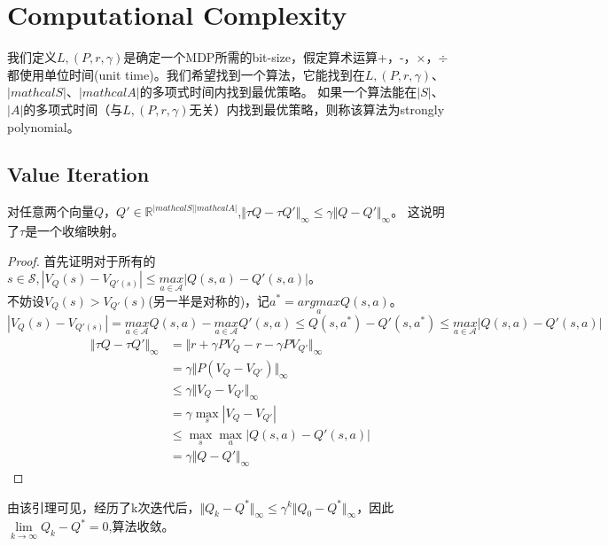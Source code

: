 \section{Computational Complexity}
我们定义$L,(P,r,\gamma)$是确定一个MDP所需的bit-size，假定算术运算+，-，$\times$，$\div$都使用单位时间(unit time)。我们希望找到一个算法，它能找到在$L,(P,r,\gamma)$、$|mathcal{S}|$、$|mathcal{A}|$的多项式时间内找到最优策略。
如果一个算法能在$|S|$、$|A|$的多项式时间（与$L,(P,r,\gamma)$无关）内找到最优策略，则称该算法为strongly polynomial。
\subsection{Value Iteration}
\begin{lemma}[收缩性]
    对任意两个向量$Q$，$Q'\in \mathbb{R}^{|mathcal{S}||mathcal{A}|}$,$\Vert \tau Q-\tau Q' \Vert_\infty\leq\gamma\Vert Q-Q' \Vert_\infty$。
    这说明了$\tau$是一个收缩映射。
 \end{lemma}
\begin{proof}
    首先证明对于所有的$s\in \mathcal{S},|V_Q(s)-V_{Q'(s)}|\leq \underset{a\in \mathcal{A}}{max}|Q(s,a)-Q'(s,a)|$。\\
    不妨设$V_Q(s)>V_{Q'}(s)$(另一半是对称的)，记$a^*=\underset{a}{argmax}Q(s,a)$。\\
    $|V_Q(s)-V_{Q'(s)}|=\underset{a\in\mathcal{A}}{max}Q(s,a)-\underset{a\in\mathcal{A}}{max}Q'(s,a)\leq Q(s,a^*)-Q'(s,a^*)\leq\underset{a\in\mathcal{A}}{max}|Q(s,a)-Q'(s,a)|$
    \begin{equation}
        \begin{aligned}
            \Vert \tau Q-\tau Q' \Vert_\infty &= \Vert r+\gamma PV_Q-r-\gamma PV_{Q'} \Vert_\infty\\
            &= \gamma \Vert P(V_Q-V_{Q'}) \Vert_\infty\\
            &\leq \gamma \Vert V_Q-V_{Q'} \Vert_\infty\\
            &= \gamma \underset{s}{\max}|V_Q-V_{Q'}|\\
            &\leq \underset{s}{\max}\underset{a}{\max}|Q(s,a)-Q'(s,a)|\\
            &= \gamma\Vert Q-Q' \Vert_\infty
        \end{aligned}
    \end{equation}
\end{proof}
由该引理可见，经历了k次迭代后，$\Vert Q_k-Q^* \Vert_\infty\leq\gamma^k\Vert Q_0-Q^*\Vert_\infty$，因此$\underset{k\to \infty}{\lim}Q_k-Q^*=0$,算法收敛。

